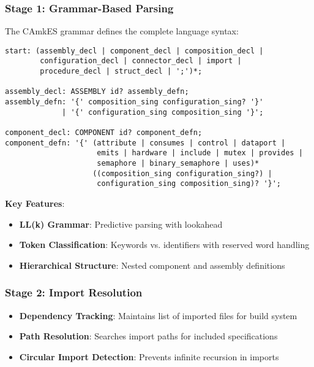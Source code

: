 \documentclass[12pt,a4paper]{article}
\begin{document}
\subsubsection{Stage 1: Grammar-Based Parsing}
The CAmkES grammar defines the complete language syntax:


\begin{lstlisting}[style=grammar]
start: (assembly_decl | component_decl | composition_decl |
        configuration_decl | connector_decl | import |
        procedure_decl | struct_decl | ';')*;

assembly_decl: ASSEMBLY id? assembly_defn;
assembly_defn: '{' composition_sing configuration_sing? '}'
             | '{' configuration_sing composition_sing '}';

component_decl: COMPONENT id? component_defn;
component_defn: '{' (attribute | consumes | control | dataport | 
                     emits | hardware | include | mutex | provides | 
                     semaphore | binary_semaphore | uses)*
                    ((composition_sing configuration_sing?) | 
                     configuration_sing composition_sing)? '}';
\end{lstlisting}

\textbf{Key Features}:
\begin{itemize}
    \item \textbf{LL(k) Grammar}: Predictive parsing with lookahead
    \item \textbf{Token Classification}: Keywords vs. identifiers with reserved word handling
    \item \textbf{Hierarchical Structure}: Nested component and assembly definitions
\end{itemize}

\subsubsection{Stage 2: Import Resolution}
\begin{itemize}
    \item \textbf{Dependency Tracking}: Maintains list of imported files for build system
    \item \textbf{Path Resolution}: Searches import paths for included specifications
    \item \textbf{Circular Import Detection}: Prevents infinite recursion in imports
\end{itemize}
\end{document}
